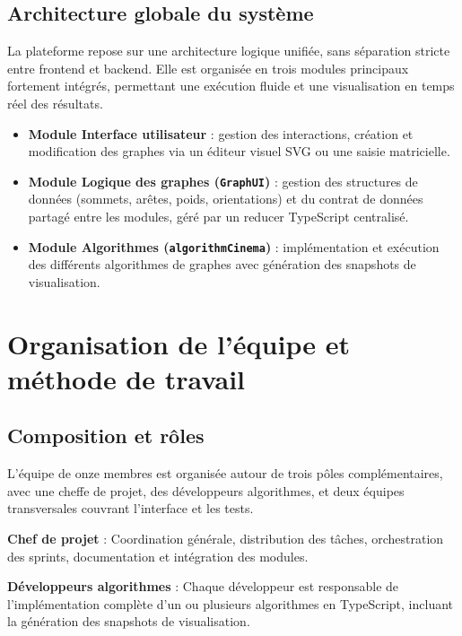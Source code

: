 \documentclass[a4paper,12pt]{report}
\begin{document}
\section{Architecture globale du système}

La plateforme repose sur une architecture logique unifiée, sans séparation stricte entre
frontend et backend. Elle est organisée en trois modules principaux fortement intégrés,
permettant une exécution fluide et une visualisation en temps réel des résultats.

\begin{itemize}
    \item \textbf{Module Interface utilisateur} : gestion des interactions, création et
          modification des graphes via un éditeur visuel SVG ou une saisie matricielle.
    \item \textbf{Module Logique des graphes (\texttt{GraphUI})} : gestion des structures
          de données (sommets, arêtes, poids, orientations) et du contrat de données
          partagé entre les modules, géré par un reducer TypeScript centralisé.
    \item \textbf{Module Algorithmes (\texttt{algorithmCinema})} : implémentation et exécution
          des différents algorithmes de graphes avec génération des snapshots de visualisation.
\end{itemize}

\clearpage


\chapter{Organisation de l'équipe et méthode de travail}

\section{Composition et rôles}

L'équipe de onze membres est organisée autour de trois pôles complémentaires, avec une cheffe
de projet, des développeurs algorithmes, et deux équipes transversales couvrant l'interface et
les tests.

\textbf{Chef de projet} : Coordination générale, distribution des tâches, orchestration des
sprints, documentation et intégration des modules.

\textbf{Développeurs algorithmes} : Chaque développeur est responsable de l'implémentation
complète d'un ou plusieurs algorithmes en TypeScript, incluant la génération des snapshots
de visualisation.
\end{document}
